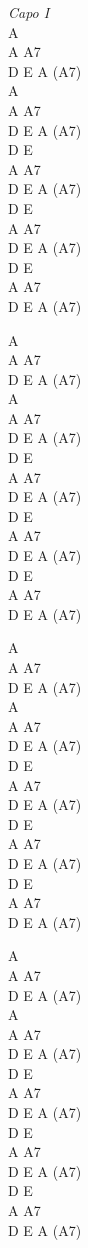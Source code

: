 \begin{chord}
    \textit{Capo I}\\
    A\\
    A A7\\
    D E A (A7)\\
    A\\
    A A7\\
    D E A (A7)\\
    D E\\
    A A7\\
    D E A (A7)\\
    D E\\
    A A7\\
    D E A (A7)\\
    D E\\
    A A7\\
    D E A (A7)

    A\\
    A A7\\
    D E A (A7)\\
    A\\
    A A7\\
    D E A (A7)\\
    D E\\
    A A7\\
    D E A (A7)\\
    D E\\
    A A7\\
    D E A (A7)\\
    D E\\
    A A7\\
    D E A (A7)

    A\\
    A A7\\
    D E A (A7)\\
    A\\
    A A7\\
    D E A (A7)\\
    D E\\
    A A7\\
    D E A (A7)\\
    D E\\
    A A7\\
    D E A (A7)\\
    D E\\
    A A7\\
    D E A (A7)

    A\\
    A A7\\
    D E A (A7)\\
    A\\
    A A7\\
    D E A (A7)\\
    D E\\
    A A7\\
    D E A (A7)\\
    D E\\
    A A7\\
    D E A (A7)\\
    D E\\
    A A7\\
    D E A (A7)
\end{chord}